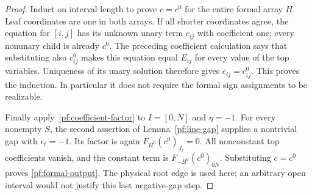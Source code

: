 \begin{proof}
Induct on interval length to prove $c=c^0$ for the entire formal
array $H$. Leaf coordinates are one in both arrays. If all shorter
coordinates agree, the equation for $[i,j]$ has its unknown unary
term $c_{ij}$ with coefficient one; every nonunary child is already
$c^0$. The preceding coefficient calculation says that substituting
also $c^0_{ij}$ makes this equation equal $E_{ij}$ for every value
of the top variables. Uniqueness of its unary solution therefore
gives $c_{ij}=c^0_{ij}$. This proves the induction. In particular it
does not require the formal sign assignments to be realizable.

Finally apply~\eqref{pf:coefficient-factor} to $I=[0,N]$ and
$\eta=-1$. For every nonempty $S$, the second assertion of
Lemma~\ref{pf:line-gap} supplies a nontrivial gap with
$\epsilon_\ell=-1$. Its factor is again $F_{H^0}(c^0)_{J_\ell}=0$.
All nonconstant top coefficients vanish, and the constant term is
$F_{-H^0}(c^0)_{0N}$. Substituting $c=c^0$ proves
\eqref{pf:formal-output}. The physical root edge is used here;
an arbitrary open interval would not justify this last negative-gap
step.
\end{proof}

